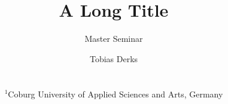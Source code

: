 \documentclass{download/egPublStyle-cgf/egpubl}
\author[Master Seminar]{\parbox{\textwidth}{\centering Master Seminar}}
\author[Derks]
    {\parbox{\textwidth}{\centering 
            Tobias Derks     		      		                
            }
            \\
            {
                \parbox{\textwidth}
                {
                    \centering $^1$Coburg University of Applied Sciences and Arts, Germany
                }
            }
    }
\title[Short Title]{A Long Title}
\begin{document}
%     
\maketitle
\begin{abstract}


\end{abstract}

 


\end{document}
